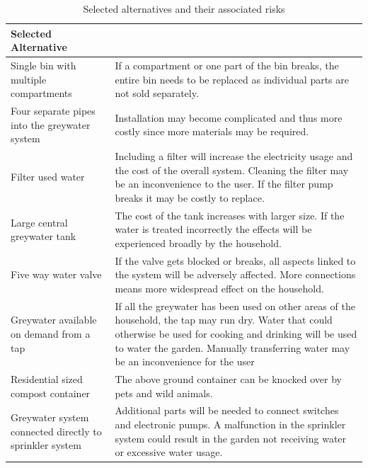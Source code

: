 \documentclass[a4paper,11pt,fleqn]{report}
\begin{document}
\begin{table}[h!]
\caption {Selected alternatives and their associated risks} \label{tb: Functional_SS_elements} 
\begin{center}
\begin{tabular}{p{7cm}|p{7cm}}\toprule
	{\textbf{Selected Alternative}} & {\textbf{Associated Risk}\\ \midrule
    \hline
    Single bin with multiple compartments & If a compartment or one part of the bin breaks, the entire bin needs to be replaced as individual parts are not sold separately.\\
        \hline
    Four separate pipes into the greywater system  & Installation may become complicated and thus more costly since more materials may be required.\\
        \hline
    Filter used water & Including a filter will increase the electricity usage and the cost of the overall system. Cleaning the filter may be an inconvenience to the user. If the filter pump breaks it may be costly to replace. \\
        \hline
   Large central greywater tank & The cost of the tank increases with larger size. If the water is treated incorrectly the effects will be experienced broadly by the household. \\
        \hline
    Five way water valve & If the valve gets blocked or breaks, all aspects linked to the system will be adversely affected. More connections means more widespread effect on the household.\\
        \hline
    Greywater available on demand from a tap & If all the greywater has been used on other areas of the household, the tap may run dry. Water that could otherwise be used for cooking and drinking will be used to water the garden. Manually transferring water may be an inconvenience for the user\\
        \hline
    Residential sized compost container & The above ground container can be knocked over by pets and wild animals.\\
        \hline
    Greywater system connected directly to sprinkler system & Additional parts will be needed to connect switches and electronic pumps. A malfunction in the sprinkler system could result in the garden not receiving water or excessive water usage. \\
    \bottomrule
\end{tabular}
\end{center}
\end{table}
%
\end{document}

